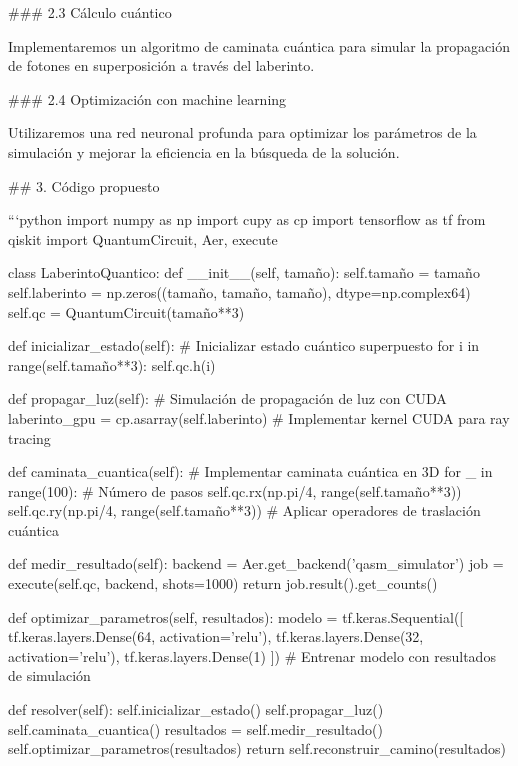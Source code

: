 ### 2.3 Cálculo cuántico

Implementaremos un algoritmo de caminata cuántica para simular la propagación de fotones en superposición a través del laberinto.

### 2.4 Optimización con machine learning

Utilizaremos una red neuronal profunda para optimizar los parámetros de la simulación y mejorar la eficiencia en la búsqueda de la solución.

## 3. Código propuesto

```python
import numpy as np
import cupy as cp
import tensorflow as tf
from qiskit import QuantumCircuit, Aer, execute

class LaberintoQuantico:
    def __init__(self, tamaño):
        self.tamaño = tamaño
        self.laberinto = np.zeros((tamaño, tamaño, tamaño), dtype=np.complex64)
        self.qc = QuantumCircuit(tamaño**3)
        
    def inicializar_estado(self):
        # Inicializar estado cuántico superpuesto
        for i in range(self.tamaño**3):
            self.qc.h(i)
        
    def propagar_luz(self):
        # Simulación de propagación de luz con CUDA
        laberinto_gpu = cp.asarray(self.laberinto)
        # Implementar kernel CUDA para ray tracing
        
    def caminata_cuantica(self):
        # Implementar caminata cuántica en 3D
        for _ in range(100):  # Número de pasos
            self.qc.rx(np.pi/4, range(self.tamaño**3))
            self.qc.ry(np.pi/4, range(self.tamaño**3))
            # Aplicar operadores de traslación cuántica
        
    def medir_resultado(self):
        backend = Aer.get_backend('qasm_simulator')
        job = execute(self.qc, backend, shots=1000)
        return job.result().get_counts()
    
    def optimizar_parametros(self, resultados):
        modelo = tf.keras.Sequential([
            tf.keras.layers.Dense(64, activation='relu'),
            tf.keras.layers.Dense(32, activation='relu'),
            tf.keras.layers.Dense(1)
        ])
        # Entrenar modelo con resultados de simulación
        
    def resolver(self):
        self.inicializar_estado()
        self.propagar_luz()
        self.caminata_cuantica()
        resultados = self.medir_resultado()
        self.optimizar_parametros(resultados)
        return self.reconstruir_camino(resultados)
    
